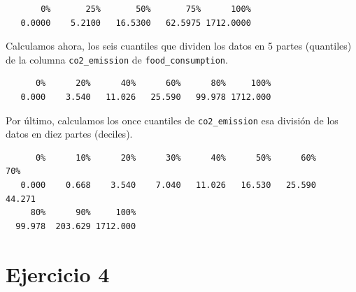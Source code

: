 \documentclass[
  letterpaper,
  DIV=11,
  numbers=noendperiod]{scrreprt}
\newenvironment{Shaded}{\begin{snugshade}}{\end{snugshade}}
\newcommand{\AttributeTok}[1]{\textcolor[rgb]{0.40,0.45,0.13}{#1}}
\newcommand{\DecValTok}[1]{\textcolor[rgb]{0.68,0.00,0.00}{#1}}
\newcommand{\FloatTok}[1]{\textcolor[rgb]{0.68,0.00,0.00}{#1}}
\newcommand{\FunctionTok}[1]{\textcolor[rgb]{0.28,0.35,0.67}{#1}}
\newcommand{\NormalTok}[1]{\textcolor[rgb]{0.00,0.23,0.31}{#1}}
\newcommand{\SpecialCharTok}[1]{\textcolor[rgb]{0.37,0.37,0.37}{#1}}
\begin{document}
\begin{Shaded}
\end{Shaded}

\begin{verbatim}
       0%       25%       50%       75%      100% 
   0.0000    5.2100   16.5300   62.5975 1712.0000 
\end{verbatim}

Calculamos ahora, los seis cuantiles que dividen los datos en 5 partes
(quantiles) de la columna \texttt{co2\_emission} de
\texttt{food\_consumption}.

\begin{Shaded}
\end{Shaded}

\begin{verbatim}
      0%      20%      40%      60%      80%     100% 
   0.000    3.540   11.026   25.590   99.978 1712.000 
\end{verbatim}

Por último, calculamos los once cuantiles de \texttt{co2\_emission} esa
división de los datos en diez partes (deciles).

\begin{Shaded}
\end{Shaded}

\begin{verbatim}
      0%      10%      20%      30%      40%      50%      60%      70% 
   0.000    0.668    3.540    7.040   11.026   16.530   25.590   44.271 
     80%      90%     100% 
  99.978  203.629 1712.000 
\end{verbatim}

\hypertarget{ejercicio-4}{%
\section{Ejercicio 4}\label{ejercicio-4}}
\end{document}
